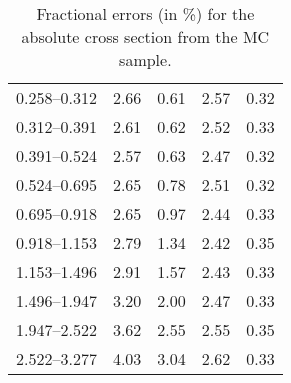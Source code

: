 \begin{table}
\begin{center}
\begin{tabular}{@{}l l l l l@{}}
            0.258--0.312 & 2.66 & 0.61 & 2.57 & 0.32  \\
            0.312--0.391 & 2.61 & 0.62 & 2.52 & 0.33  \\
            0.391--0.524 & 2.57 & 0.63 & 2.47 & 0.32  \\
            0.524--0.695 & 2.65 & 0.78 & 2.51 & 0.32  \\
            0.695--0.918 & 2.65 & 0.97 & 2.44 & 0.33  \\
            0.918--1.153 & 2.79 & 1.34 & 2.42 & 0.35  \\
            1.153--1.496 & 2.91 & 1.57 & 2.43 & 0.33  \\
            1.496--1.947 & 3.20 & 2.00 & 2.47 & 0.33  \\
            1.947--2.522 & 3.62 & 2.55 & 2.55 & 0.35  \\
            2.522--3.277 & 4.03 & 3.04 & 2.62 & 0.33  \\
            \bottomrule
        \end{tabular}
    \end{center}
    \caption[
        Fractional errors for the absolute cross section from the
        \POWHEG MC sample.
    ]{
        Fractional errors (in \%) for the absolute cross section from the
        \POWHEG MC sample.
    }
    \label{tab:powheg_uncert_abs}
\end{table}
